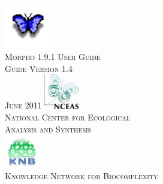 \documentclass[11pt]{article}
\begin{document}
  \pagestyle{empty}

  \begin{titlepage}
    \begin{center}
    \includegraphics[width=2cm]{images/logo-morpho.png}\\[0.5cm]
    \textsc{\LARGE Morpho 1.9.1 User Guide}\\[1cm]
    \textsc{Guide Version 1.4}\\
    \textsc{June 2011}
    \vfill
    \includegraphics[width=1.5cm]{images/logo-nceas.jpg}\\[0.5cm]
    \textsc{National Center for Ecological\\Analysis and Synthesis}\\[1cm]
    \includegraphics[width=1.5cm]{images/logo-knb.jpg}\\[0.2cm]
    \textsc{Knowledge Network for Biocomplexity}
    \end{center}
  \end{titlepage}
  \pagebreak

  \tableofcontents
  \pagebreak

  
    \setcounter{figure}{0} 
  
    \setcounter{figure}{0} 
  
    \setcounter{figure}{0} 
  
    \setcounter{figure}{0} 
  
    \setcounter{figure}{0} 
  
    \setcounter{figure}{0} 
  
    \setcounter{figure}{0} 
  
    \setcounter{figure}{0} 
  
    \setcounter{figure}{0} 
  
    \setcounter{figure}{0} 
  
    \setcounter{figure}{0} 
  
    \setcounter{figure}{0} 
  

\end{document}
